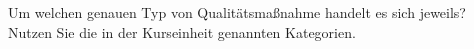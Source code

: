 Um welchen genauen Typ von Qualitätsmaßnahme handelt es sich jeweils? Nutzen Sie die in der Kurseinheit genannten Kategorien.

